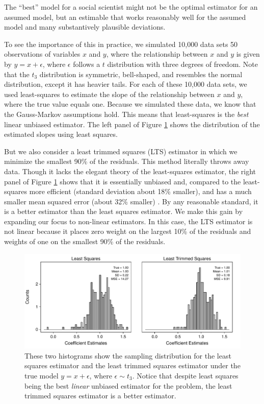 \documentclass[12pt]{article}
\begin{document}
\noindent The ``best'' model for a social scientist might not be the optimal estimator for an assumed model, but an estimable that works reasonably well for the assumed model and many substantively plausible deviations. 

To see the importance of this in practice, we simulated 10,000 data sets 50 observations of variables $x$ and $y$, where the relationship between $x$ and $y$ is given by $y = x + \epsilon$, where $\epsilon$ follows a $t$ distribution with three degrees of freedom. Note that the $t_3$ distribution is symmetric, bell-shaped, and resembles the normal distribution, except it has heavier tails. For each of these 10,000 data sets, we used least-squares to estimate the slope of the relationship between $x$ and $y$, where the true value equals one. Because we simulated these data, we know that the Gauss-Markov assumptions hold. This means that least-squares is the \textit{best} linear unbiased estimator. The left panel of Figure \ref{fig:lts-illustration} shows the distribution of the estimated slopes using least squares.

But we also consider a least trimmed squares (LTS) estimator in which we minimize the smallest 90\% of the residuals. This method literally throws away data. Though it lacks the elegant theory of the least-squares estimator, the right panel of Figure \ref{fig:lts-illustration} shows that it is essentially unbiased and, compared to the least-squares more efficient (standard deviation about 18\% smaller), and has a much smaller mean squared error (about 32\% smaller) . By any reasonable standard, it is a better estimator than the least squares estimator. We make this gain by expanding our focus to non-linear estimators. In this case, the LTS estimator is not linear because it places zero weight on the largest 10\% of the residuals and weights of one on the smallest 90\% of the residuals.

\begin{figure}[H]
\begin{center}
\includegraphics[scale = .7]{figs/lts-illustration.pdf}
\caption{These two histograms show the sampling distribution for the least squares estimator and the least trimmed squares estimator under the true model $y = x + \epsilon$, where $\epsilon \sim t_3$. Notice that despite least squares being the best \textit{linear} unbiased estimator for the problem, the least trimmed squares estimator is a better estimator.}\label{fig:lts-illustration}
\end{center}
\end{figure}
\end{document}
